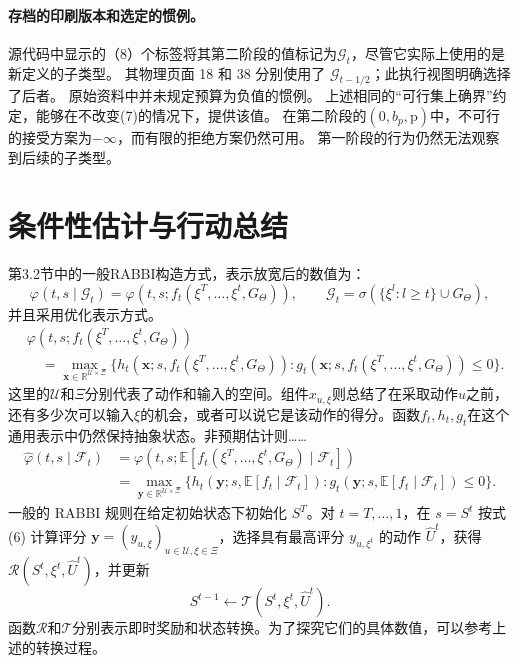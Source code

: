 \documentclass{article}
\begin{document}
\paragraph{存档的印刷版本和选定的惯例。}
源代码中显示的（8）个标签将其第二阶段的值标记为$\mathcal G_t$，尽管它实际上使用的是新定义的子类型。 其物理页面 18 和 38 分别使用了 $\mathcal G_{t-1/2}$；此执行视图明确选择了后者。 原始资料中并未规定预算为负值的惯例。 上述相同的“可行集上确界”约定，能够在不改变(7)的情况下，提供该值。 在第二阶段的$(0,b_p,\mathrm p)$中，不可行的接受方案为$-\infty$，而有限的拒绝方案仍然可用。 第一阶段的行为仍然无法观察到后续的子类型。

\section*{条件性估计与行动总结}
第3.2节中的一般RABBI构造方式，表示放宽后的数值为：
\[
\varphi(t,s\mid\mathcal G_t)
=\varphi(t,s;f_t(\xi^T,\ldots,\xi^t,G_\Theta)),
\qquad
\mathcal G_t=\sigma(\{\xi^l:l\ge t\}\cup G_\Theta),
\]
并且采用优化表示方式。
\begin{equation}
\begin{aligned}
&\varphi(t,s;f_t(\xi^T,\ldots,\xi^t,G_\Theta))\\
&\quad=\max_{\mathbf x\in\mathbb R^{\mathcal U\times\Xi}}
\bigl\{h_t(\mathbf x;s,f_t(\xi^T,\ldots,\xi^t,G_\Theta)):
 g_t(\mathbf x;s,f_t(\xi^T,\ldots,\xi^t,G_\Theta))\le0\bigr\}.
\end{aligned}\tag{5}
\end{equation}
这里的$\mathcal U$和$\Xi$分别代表了动作和输入的空间。组件$x_{u,\xi}$则总结了在采取动作$u$之前，还有多少次可以输入$\xi$的机会，或者可以说它是该动作的得分。函数$f_t,h_t,g_t$在这个通用表示中仍然保持抽象状态。非预期估计则……
\begin{equation}
\begin{aligned}
\hat\varphi(t,s\mid\mathcal F_t)
&=\varphi(t,s;\mathbb E[f_t(\xi^T,\ldots,\xi^t,G_\Theta)\mid\mathcal F_t])\\
&=\max_{\mathbf y\in\mathbb R^{\mathcal U\times\Xi}}
\{h_t(\mathbf y;s,\mathbb E[f_t\mid\mathcal F_t]):
 g_t(\mathbf y;s,\mathbb E[f_t\mid\mathcal F_t])\le0\}.
\end{aligned}\tag{6}
\end{equation}
一般的 RABBI 规则在给定初始状态下初始化 $S^T$。对 $t=T,\ldots,1$，在 $s=S^t$ 按式 (6) 计算评分 $\mathbf y=(y_{u,\xi})_{u\in\mathcal U,\xi\in\Xi}$，选择具有最高评分 $y_{u,\xi^t}$ 的动作 $\hat U^t$，获得 $\mathcal R(S^t,\xi^t,\hat U^t)$，并更新
\[
S^{t-1}\leftarrow\mathcal T(S^t,\xi^t,\hat U^t).
\]
函数$\mathcal R$和$\mathcal T$分别表示即时奖励和状态转换。为了探究它们的具体数值，可以参考上述的转换过程。
\end{document}
